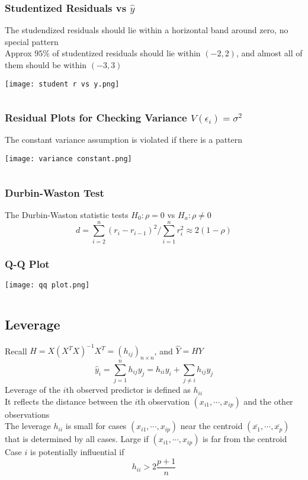 \documentclass[11pt]{article}
\begin{document}
\subsubsection{Studentized Residuals vs $\hat y$}
The studendized residuals should lie within a horizontal band around zero, no special pattern \\
Approx $95\%$ of studentized residuals should lie within $(-2,2)$, and almost all of them should be within $(-3,3)$
\begin{figure*}[h!]
    \centering
    \texttt{[image: student r vs y.png]}
\end{figure*}
$\ $\\
\subsubsection{Residual Plots for Checking Variance $V(\epsilon_i)=\sigma^2$}
The constant variance assumption is violated if there is a pattern 
\begin{figure*}[h!]
    \centering
    \texttt{[image: variance constant.png]}
\end{figure*}
$\ $\\
\newpage 
\subsubsection{Durbin-Waston Test}
The Durbin-Waston statistic tests $H_0:\rho=0$ vs $H_a:\rho\neq 0$
\[d=\sum_{i=2}^{n}(r_i-r_{i-1})^2/\sum_{i=1}^{n}r_i^2\approx 2(1-\rho)\]
\subsubsection{Q-Q Plot}
\begin{figure*}[h!]
    \centering
    \texttt{[image: qq plot.png]}
\end{figure*}
$\ $\\
\subsection{Leverage}
Recall $H=X(X^TX)^{-1}X^T=(h_{ij})_{n\times n}$, and $\hat Y=HY$ 
\[\hat y_{i} = \sum_{j=1}^{n}h_{ij}y_j = h_{ii}y_i + \sum_{j\neq i}h_{ij}y_j\]
Leverage of the $i$th observed predictor is defined as $h_{ii}$ \\
It reflects the distance between the $i$th observation $(x_{i1},\cdots,x_{ip})$ and the other observations \\
The leverage $h_{ii}$ is small for cases $(x_{i1},\cdots,x_{ip})$ near the centroid $(\overline{x_1},\cdots,\overline{x_p})$ 
that is determined by all cases. Large if $(x_{i1},\cdots,x_{ip})$ is far from the centroid \\
Case $i$ is potentially influential if 
\[h_{ii}>2\frac{p+1}{n}\]
\end{document}
